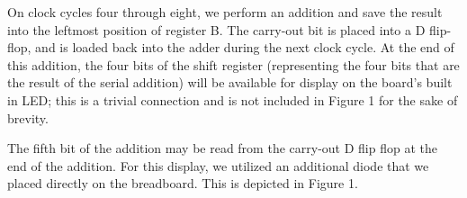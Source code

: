 \documentclass[paper=letter, fontsize=11pt]{scrartcl}
\begin{document}
On clock cycles four through eight, we perform an addition and save the result into the leftmost position of register B. The carry-out bit is placed into a D flip-flop, and is loaded back into the adder during the next clock cycle. At the end of this addition, the four bits of the shift register (representing the four bits that are the result of the serial addition) will be available for display on the board's built in LED; this is a trivial connection and is not included in Figure 1 for the sake of brevity.

The fifth bit of the addition may be read from the carry-out D flip flop at the end of the addition. For this display, we utilized an additional diode that we placed directly on the breadboard. This is depicted in Figure 1.

\end{document}
